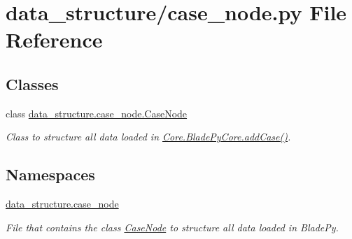 \hypertarget{a00017}{}\section{data\+\_\+structure/case\+\_\+node.py File Reference}
\label{a00017}
\subsection*{Classes}
\begin{DoxyCompactItemize}
\item 
class \hyperlink{a00086}{data\+\_\+structure.\+case\+\_\+node.\+Case\+Node}
\begin{DoxyCompactList}\small\item\em Class to structure all data loaded in \hyperlink{a00078_a1a62f9b5b8f5929bdb6f0a8c27049d9e}{Core.\+Blade\+Py\+Core.\+add\+Case()}. \end{DoxyCompactList}\end{DoxyCompactItemize}
\subsection*{Namespaces}
\begin{DoxyCompactItemize}
\item 
 \hyperlink{a00053}{data\+\_\+structure.\+case\+\_\+node}
\begin{DoxyCompactList}\small\item\em File that contains the class \hyperlink{a00086}{Case\+Node} to structure all data loaded in Blade\+Py. \end{DoxyCompactList}\end{DoxyCompactItemize}
